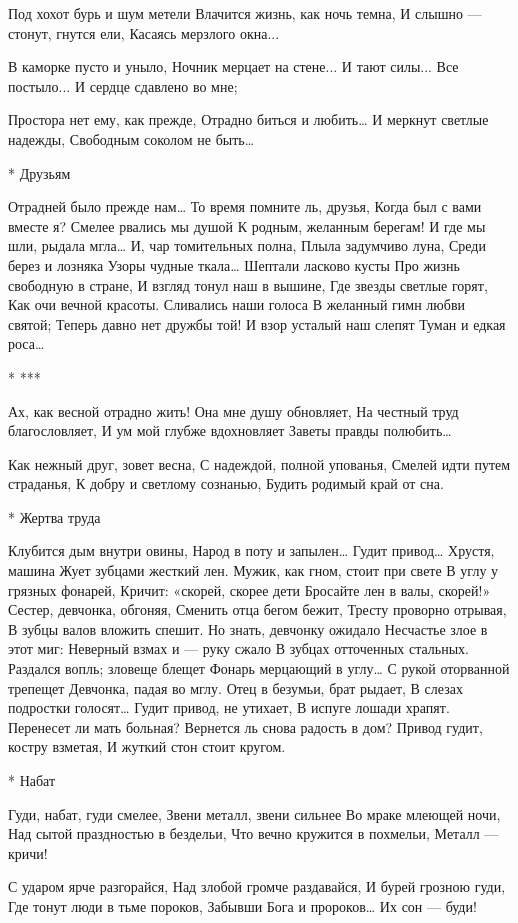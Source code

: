 Под хохот бурь и шум метели
Влачится жизнь, как ночь темна,
И слышно — стонут, гнутся ели,
Касаясь мерзлого окна...

В каморке пусто и уныло,
Ночник мерцает на стене...
И тают силы... Все постыло...
И сердце сдавлено во мне;

Простора нет ему, как прежде,
Отрадно биться и любить…
И меркнут светлые надежды,
Свободным соколом не быть…


* Друзьям

Отрадней было прежде нам…
То время помните ль, друзья,
Когда был с вами вместе я?
Смелее рвались мы душой
К родным, желанным берегам!
И где мы шли, рыдала мгла…
И, чар томительных полна,
Плыла задумчиво луна,
Среди берез и лозняка
Узоры чудные ткала…
Шептали ласково кусты
Про жизнь свободную в стране,
И взгляд тонул наш в вышине,
Где звезды светлые горят,
Как очи вечной красоты.
Сливались наши голоса
В желанный гимн любви святой;
Теперь давно нет дружбы той!
И взор усталый наш слепят
Туман и едкая роса…


* ***

Ах, как весной отрадно жить!
Она мне душу обновляет,
На честный труд благословляет,
И ум мой глубже вдохновляет
Заветы правды полюбить…

Как нежный друг, зовет весна,
С надеждой, полной упованья,
Смелей идти путем страданья,
К добру и светлому сознанью,
Будить родимый край от сна.


* Жертва труда

Клубится дым внутри овины,
Народ в поту и запылен…
Гудит привод… Хрустя, машина
Жует зубцами жесткий лен.
Мужик, как гном, стоит при свете
В углу у грязных фонарей,
Кричит: «скорей, скорее дети
Бросайте лен в валы, скорей!»
Сестер, девчонка, обгоняя,
Сменить отца бегом бежит,
Тресту проворно отрывая,
В зубцы валов вложить спешит.
Но знать, девчонку ожидало
Несчастье злое в этот миг:
Неверный взмах и — руку сжало
В зубцах отточенных стальных.
Раздался вопль; зловеще блещет
Фонарь мерцающий в углу…
С рукой оторванной трепещет
Девчонка, падая во мглу.
Отец в безумьи, брат рыдает,
В слезах подростки голосят…
Гудит привод, не утихает,
В испуге лошади храпят.
Перенесет ли мать больная?
Вернется ль снова радость в дом?
Привод гудит, костру взметая,
И жуткий стон стоит кругом.


* Набат

Гуди, набат, гуди смелее,
Звени металл, звени сильнее
Во мраке млеющей ночи,
Над сытой праздностью в бездельи,
Что вечно кружится в похмельи,
Металл — кричи!

С ударом ярче разгорайся,
Над злобой громче раздавайся,
И бурей грозною гуди,
Где тонут люди в тьме пороков,
Забывши Бога и пророков…
Их сон — буди!

